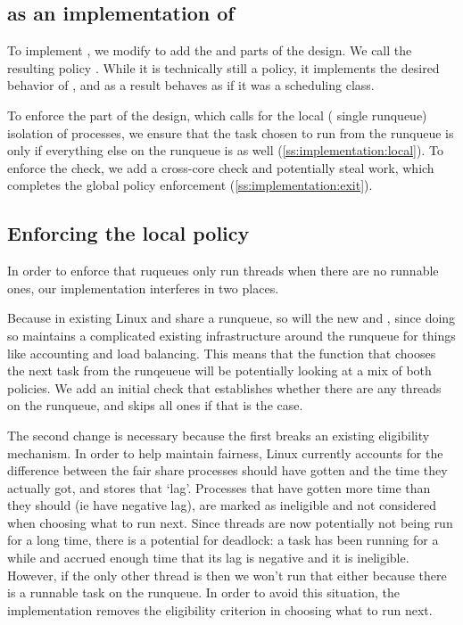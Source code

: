 \subsection{\schedbe{} as an implementation of \beclass{}}

To implement \beclass{}, we modify \schedidle{} to add the \local{} and \exit{}
parts of the \beclass{} design. We call the resulting policy \schedbe{}. While
it is technically still a policy, it implements the desired behavior of
\beclass{}, and as a result behaves as if it was a scheduling class.

To enforce the \local{} part of the design, which calls for the local (\ie{}
single runqueue) isolation of \schedbe{} processes, we ensure that the task
chosen to run from the runqueue is only \schedbe{} if everything else on the
runqueue is as well (\autoref{ss:implementation:local}). To enforce the \exit{}
check, we add a cross-core check and potentially steal work, which completes the
global policy enforcement (\autoref{ss:implementation:exit}).

\subsection{Enforcing the local policy}\label{ss:implementation:local}

In order to enforce that ruqueues only run \schedbe{} threads when there are no
runnable \schednormal{} ones, our implementation interferes in two places. 

Because in existing Linux \schedidle{} and \schednormal{} share a runqueue, so
will the new \schedbe{} and \schednormal{}, since doing so maintains a
complicated existing infrastructure around the runqueue for things like
accounting and load balancing. This means that the function that chooses the
next task from the runqeueue will be potentially looking at a mix of both
policies. We add an initial check that establishes whether there are any
\schednormal{} threads on the runqueue, and skips all \schedbe{} ones if that is
the case. 

The second change is necessary because the first breaks an existing eligibility
mechanism. In order to help maintain fairness, Linux currently accounts for the
difference between the fair share processes should have gotten and the time they
actually got, and stores that `lag'. Processes that have gotten more time than
they should (ie have negative lag), are marked as ineligible and not considered
when choosing what to run next. Since \schedbe{} threads are now potentially not
being run for a long time, there is a potential for deadlock: a \schednormal{}
task has been running for a while and accrued enough time that its lag is
negative and it is ineligible. However, if the only other thread is \schedbe{}
then we won't run that either because there is a runnable \schednormal{} task on
the runqueue. In order to avoid this situation, the implementation removes the
eligibility criterion in choosing what to run next.


